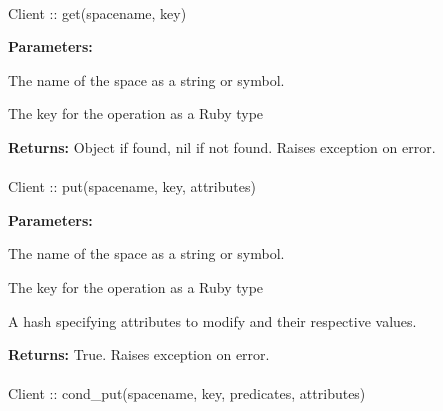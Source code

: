 
\paragraph{}
\begin{ccode}
Client :: get(spacename, key)
\end{ccode}
\funcdesc 

\noindent\textbf{Parameters:}
\begin{description}[labelindent=\widthof{{\code{spacename}}},leftmargin=*,noitemsep,nolistsep,align=right]
\item[\code{spacename}] The name of the space as a string or symbol.
\item[\code{key}] The key for the operation as a Ruby type
\end{description}

\noindent\textbf{Returns:}
Object if found, nil if not found.  Raises exception on error.

\paragraph{}
\begin{ccode}
Client :: put(spacename, key, attributes)
\end{ccode}
\funcdesc 

\noindent\textbf{Parameters:}
\begin{description}[labelindent=\widthof{{\code{attributes}}},leftmargin=*,noitemsep,nolistsep,align=right]
\item[\code{spacename}] The name of the space as a string or symbol.
\item[\code{key}] The key for the operation as a Ruby type
\item[\code{attributes}] A hash specifying attributes to modify and their respective values.
\end{description}

\noindent\textbf{Returns:}
True.  Raises exception on error.

\paragraph{}
\begin{ccode}
Client :: cond_put(spacename, key, predicates, attributes)
\end{ccode}
\funcdesc 

